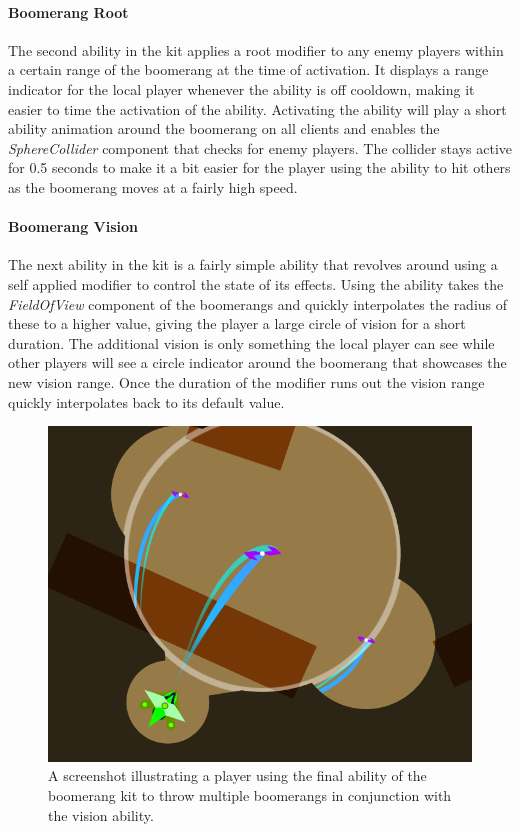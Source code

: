\paragraph{Boomerang Root}
The second ability in the kit applies a root modifier to any enemy players within a certain range of the boomerang at the time of activation. It displays a range indicator for the local player whenever the ability is off cooldown, making it easier to time the activation of the ability. Activating the ability will play a short ability animation around the boomerang on all clients and enables the \emph{SphereCollider} component that checks for enemy players. The collider stays active for 0.5 seconds to make it a bit easier for the player using the ability to hit others as the boomerang moves at a fairly high speed. 

\paragraph{Boomerang Vision}
The next ability in the kit is a fairly simple ability that revolves around using a self applied modifier to control the state of its effects. Using the ability takes the \emph{FieldOfView} component of the boomerangs and quickly interpolates the radius of these to a higher value, giving the player a large circle of vision for a short duration. The additional vision is only something the local player can see while other players will see a circle indicator around the boomerang that showcases the new vision range. Once the duration of the modifier runs out the vision range quickly interpolates back to its default value. 

\begin{figure}[tbph]  %
  \centering
  \includegraphics[width=.75\textwidth]{images/boomerangKitMultirang}
  \caption[Screenshot of the multi-boomerang ability]{A screenshot illustrating a player using the final ability of the boomerang kit to throw multiple boomerangs in conjunction with the vision ability.}
  \label{fig:boomerangMultirang}
\end{figure}

